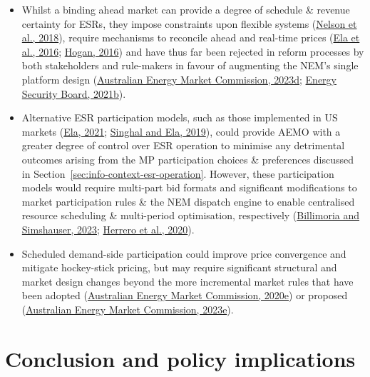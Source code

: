 \documentclass[12pt,a4paper,]{report}
\providecommand{\tightlist}{%
  \setlength{\itemsep}{0pt}\setlength{\parskip}{0pt}}
\begin{document}
\begin{itemize}
\tightlist
\item
  Whilst a binding ahead market can provide a degree of schedule \&
  revenue certainty for ESRs, they impose constraints upon flexible
  systems
  (\protect\hyperlink{ref-nelsonInvestigatingEconomicValue2018}{Nelson
  et al., 2018}), require mechanisms to reconcile ahead and real-time
  prices (\protect\hyperlink{ref-elaWholesaleElectricityMarket2016}{Ela
  et al., 2016};
  \protect\hyperlink{ref-hoganVirtualBiddingElectricity2016a}{Hogan,
  2016}) and have thus far been rejected in reform processes by both
  stakeholders and rule-makers in favour of augmenting the NEM's single
  platform design
  (\protect\hyperlink{ref-australianenergymarketcommissionImprovingSecurityFrameworks2023}{Australian
  Energy Market Commission, 2023d};
  \protect\hyperlink{ref-energysecurityboardPost2025MarketDesign2021}{Energy
  Security Board, 2021b}).
\item
  Alternative ESR participation models, such as those implemented in US
  markets
  (\protect\hyperlink{ref-elaIntegrationElectricStorage2021}{Ela, 2021};
  \protect\hyperlink{ref-singhalIncorporatingElectricStorage2019}{Singhal
  and Ela, 2019}), could provide AEMO with a greater degree of control
  over ESR operation to minimise any detrimental outcomes arising from
  the MP participation choices \& preferences discussed in
  Section~\ref{sec:info-context-esr-operation}. However, these
  participation models would require multi-part bid formats and
  significant modifications to market participation rules \& the NEM
  dispatch engine to enable centralised resource scheduling \&
  multi-period optimisation, respectively
  (\protect\hyperlink{ref-billimoriaContractDesignStorage2023a}{Billimoria
  and Simshauser, 2023};
  \protect\hyperlink{ref-herreroEvolvingBiddingFormats2020}{Herrero et
  al., 2020}).
\item
  Scheduled demand-side participation could improve price convergence
  and mitigate hockey-stick pricing, but may require significant
  structural and market design changes beyond the more incremental
  market rules that have been adopted
  (\protect\hyperlink{ref-australianenergymarketcommissionWholesaleDemandResponse2020}{Australian
  Energy Market Commission, 2020e}) or proposed
  (\protect\hyperlink{ref-australianenergymarketcommissionIntegratingPriceresponsiveResources2023}{Australian
  Energy Market Commission, 2023e}).
\end{itemize}

\hypertarget{sec:info-conclusion}{%
\section{Conclusion and policy implications}\label{sec:info-conclusion}}
\end{document}
